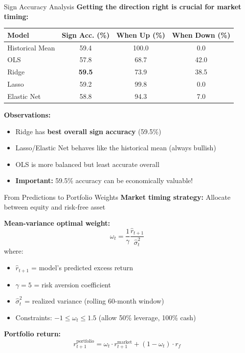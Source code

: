 \documentclass[10pt]{beamer}
\newcommand{\highlight}[1]{\textcolor{AccentOrange}{\textbf{#1}}}
\newcommand{\highlightgreen}[1]{\textcolor{AccentGreen}{\textbf{#1}}}
\begin{document}
\begin{frame}{Sign Accuracy Analysis}
  \textbf{Getting the direction right is crucial for market timing:}
  
  \vspace{0.5em}
  \begin{table}[h]
    \centering
    \small
    \begin{tabular}{lccc}
      \toprule
      \textbf{Model} & \textbf{Sign Acc. (\%)} & \textbf{When Up (\%)} & \textbf{When Down (\%)} \\
      \midrule
      Historical Mean & 59.4 & 100.0 & 0.0 \\
      OLS & 57.8 & 68.7 & 42.0 \\
      Ridge & \highlightgreen{59.5} & 73.9 & 38.5 \\
      Lasso & 59.2 & 99.8 & 0.0 \\
      Elastic Net & 58.8 & 94.3 & 7.0 \\
      \bottomrule
    \end{tabular}
  \end{table}
  
  \vspace{0.5em}
  \textbf{Observations:}
  \begin{itemize}
    \item Ridge has \highlight{best overall sign accuracy} (59.5\%)
    \item Lasso/Elastic Net behaves like the historical mean (always bullish)
    \item OLS is more balanced but least accurate overall
    \item \highlight{Important:} 59.5\% accuracy can be economically valuable!
  \end{itemize}
\end{frame}

\begin{frame}{From Predictions to Portfolio Weights}
  \textbf{Market timing strategy:} Allocate between equity and risk-free asset
  
  \vspace{1em}
  \textbf{Mean-variance optimal weight:}
  \[
  \omega_t = \frac{1}{\gamma}\frac{\widehat{r}_{t+1}}{\widehat{\sigma}^2_t}
  \]
  where:
  \begin{itemize}
    \item $\widehat{r}_{t+1}$ = model's predicted excess return
    \item $\gamma = 5$ = risk aversion coefficient
    \item $\widehat{\sigma}^2_t$ = realized variance (rolling 60-month window)
    \item Constraints: $-1 \leq \omega_t \leq 1.5$ (allow 50\% leverage, 100\% cash)
  \end{itemize}
  
  \vspace{1em}
  \textbf{Portfolio return:}
  \[
  r_{t+1}^{\text{portfolio}} = \omega_t \cdot r_{t+1}^{\text{market}} + (1-\omega_t) \cdot r_f
  \]
\end{frame}
\end{document}
